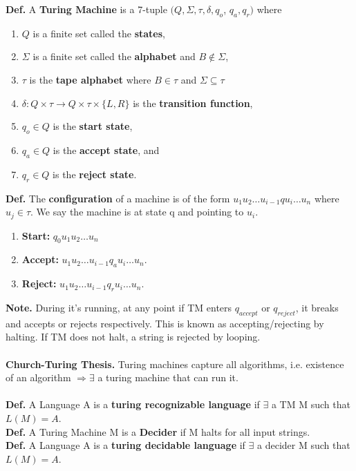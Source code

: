 \documentclass[12pt]{article}
\begin{document}
\begin{multicols}{2}
\noindent\textbf{Def.} A \textbf{Turing Machine} is a 7-tuple $(Q, \Sigma, \tau, \delta, q_{o}$, $q_{a}, q_{r})$ where
\begin{enumerate}
\itemsep-0.5em
\item $Q$ is a finite set called the \textbf{states},
\item $\Sigma$ is a finite set called the \textbf{alphabet} and $B \not\in \Sigma$,
\item $\tau$ is the \textbf{tape alphabet} where $B \in \tau$ and $\Sigma \subseteq \tau$
\item $\delta: Q \times \tau \rightarrow Q \times \tau \times \big\{L,R\big\}$ is the \textbf{transition function},
\item $q_{o} \in Q$ is the \textbf{start state},
\item $q_{a} \in Q$ is the \textbf{accept state}, and
\item $q_{r} \in Q$ is the \textbf{reject state}.
\end{enumerate}
\textbf{Def.} The \textbf{configuration} of a machine is of the form $u_{1} u_{2} \dots u_{i-1} q u_{i} \dots u_{n}$ where $u_{j} \in \tau$. We say the machine is at state q and pointing to $u_{i}$.
\begin{enumerate}
\itemsep-0.5em
\item \textbf{Start:} $q_{0} u_{1} u_{2} \dots u_{n}$
\item \textbf{Accept:} $u_{1} u_{2} \dots u_{i-1} q_{a} u_{i} \dots u_{n}$.
\item \textbf{Reject:} $u_{1} u_{2} \dots u_{i-1} q_{r} u_{i} \dots u_{n}$.
\end{enumerate}
\textbf{Note.} During it's running, at any point if TM enters $q_{accept}$ or $q_{reject}$, it breaks and accepts or rejects respectively. This is known as accepting/rejecting by halting. If TM does not halt, a string is rejected by looping.\\\\
\textbf{Church-Turing Thesis.} Turing machines capture all algorithms, i.e. existence of an algorithm $\Rightarrow \exists$ a turing machine that can run it. \\\\
\textbf{Def.} A Language A is a \textbf{turing recognizable language} if $\exists$ a TM M such that $L(M) = A.$\\
\textbf{Def.} A Turing Machine M is a \textbf{Decider} if M halts for all input strings.\\
\textbf{Def.} A Language A is a \textbf{turing decidable language} if $\exists$ a decider M such that $L(M) = A.$\\

\end{multicols}
\end{document}
